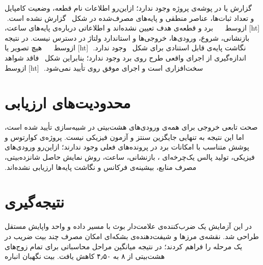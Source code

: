 ‫
‫
‫
‫گزارش  یا  در پوشه‌ی پروژه وجود ندارد؛ ازاین‌رو
‫اطلاعات نام قطعه، وضعیت کامپایل و تعداد ثبات‌ها، عناصر منطقی و پایه‌های مصرف‌شده در
‫شکل~ گزارش نشده است.
‫
‫[ht]
‫‌ازوسط
‫
‫
‫
‫
‫برد و قطعه‌ی هدف تعیین نشده‌اند و اطلاعاتی درباره‌ی پایه‌های ساعت، بازنشانی، شروع، ورودی‌ها،
‫خروجی‌ها و استاندارد ولتاژ در دسترس نیست. در نتیجه نگاشت پایه‌ی قابل استنادی برای
‫شکل~ وجود ندارد.
‫
‫[ht]
‫‌ازوسط
‫
‫
‫
‫
‫هیچ تصویر یا اندازه‌گیری از اجرای واقعی طرح روی برد وجود ندارد؛ بنابراین شکل~
‫فاقد شواهد سخت‌افزاری است و اجرای موفق روی  تأیید نمی‌شود.
‫
‫[ht]
‫‌ازوسط
‫
‫
‫
‫
‫
‫\section{محدودیت‌های ارزیابی}
‫
‫صحت تابعی خروجی برای همه‌ی ورودی‌های هشت‌بیتی در شبیه‌سازی تأیید شده است، اما این نتیجه
‫به تنهایی جایگزین سنتز و آزمون فیزیکی نیست. پروژه‌ی کوارتوس و پوشش متناسب با امکانات برد
‫در پرونده‌های فعلی وجود ندارند؛ ازاین‌رو ورودی‌های فیزیکی، تولید پالس یک‌چرخه‌ای ،
‫بازنشانی، ساعت، روش نمایش حاصل شانزده‌بیتی، مصرف منابع، بیشینه‌ی فرکانس و نگاشت پایه‌ها
‫ارزیابی نشده‌اند.
‫
‫
‫\section{نتیجه‌گیری}
‫
‫در این آزمایش یک ضرب‌کننده‌ی علامت‌دار بوث با مسیر داده و واحد واپایش مستقل طراحی شد. نقشه‌ی
‫مرزها و شیفت‌دهنده‌ی بشکه‌ای امکان مصرف چند بیت ضریب در یک مرحله را فراهم کردند؛ در نتیجه
‫میانگین مراحل محاسباتی برای تمام زوج‌های هشت‌بیتی از ۸ به ۴٫۵۰ کاهش یافت. بیت نگهبان انباره
